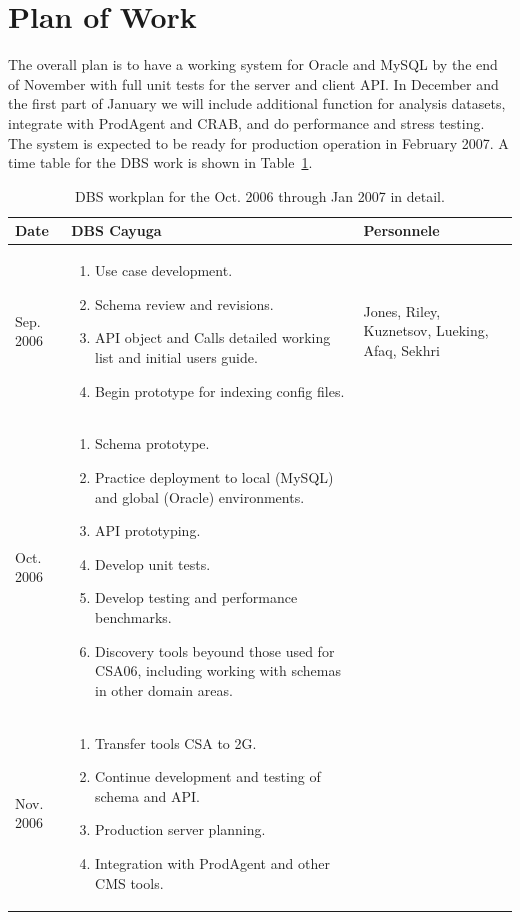 \documentclass{cmspaper}
\begin{document}
\section{Plan of Work}
The overall plan is to have a working system for Oracle and MySQL by the end of November with full unit tests for the server and client API. In December and the first  part of January we will include additional function for analysis datasets, integrate with ProdAgent and CRAB,  and do performance and stress testing. The system  is expected to be ready for production operation in February 2007.
A time table for the DBS work is shown in Table~\ref{tab:dbs-work-plan}.
\begin{table}[htb]
    \caption{DBS workplan for the Oct. 2006 through Jan 2007 in detail.  }
    \label{tab:dbs-work-plan}
    \begin{center}
      \begin{tabular}{|l|p{3.5in}|p{1.5in}|} \hline 
Date & DBS Cayuga & Personnele  \\ \hline
Sep. 2006 & \begin{enumerate} \item Use case development. \item Schema review and revisions. \item API object and Calls detailed working list and initial users guide. \item Begin prototype for indexing config files.\end{enumerate} & Jones, Riley, Kuznetsov, Lueking, Afaq, Sekhri   \\ \hline
Oct. 2006  & \begin{enumerate} \item Schema prototype. \item Practice deployment to local (MySQL) and global (Oracle) environments.  \item API prototyping. \item Develop unit tests.  \item  Develop testing and performance benchmarks. \item Discovery tools beyound those used for CSA06, including working with schemas in other domain areas. \end{enumerate}& \\ \hline
Nov. 2006  & \begin{enumerate} \item Transfer tools CSA to 2G. \item Continue development and testing of schema and API. \item Production server planning. \item Integration with ProdAgent and other CMS tools. \end{enumerate}  &  \\ \hline

\end{tabular}
\end{center}
\end{table}
\end{document}
